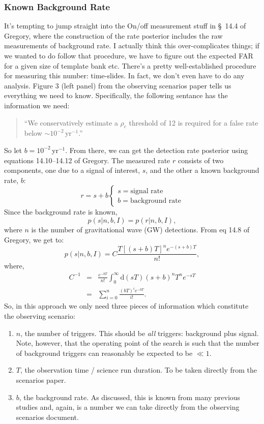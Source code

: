 \documentclass[twocolumn,nofootinbib]{revtex4-1}
\newcommand{\diff}{{\mathrm d}}
\def\gw#1{gravitational wave#1 (GW#1)\gdef\gw{GW}}
\begin{document}
\subsubsection{Known Background Rate}
It's tempting to jump straight into the On/off measurement stuff in \S~14.4 of
Gregory, where the construction of the rate posterior includes the raw
measurements of background rate.  I actually think this over-complicates things;
if we wanted to do follow that procedure, we have to figure out the expected FAR
for a given size of template bank etc.  There's a pretty well-established
procedure for measuring this number: time-slides.  In fact, we don't even have
to do any analysis.  Figure 3 (left panel) from the observing scenarios paper
tells us everything we need to know.  Specifically, the following sentance has
the information we need:
\begin{quote}
``We conservatively estimate a $\rho_c$ threshold of 12 is required for a false rate below
$\sim 10^{−2}$\,yr$^{−1}$.''
\end{quote}
%
So let $b=10^{-2}$\,yr$^{-1}$.  From there, we can get the detection rate
posterior using equations 14.10--14.12 of Gregory.  The measured rate $r$
consists of two components, one due to a signal of interest, $s$, and the other
a known background rate, $b$:
\begin{equation}
r = s + b
\begin{cases}
s = \text{signal rate} \\
b = \text{background rate}
\end{cases}
\end{equation}
%
Since the background rate is known,
\begin{equation}
p(s|n,b,I) = p(r|n,b,I),
\end{equation}
%
where $n$ is the number of \gw{} detections.  From eq 14.8 of Gregory, we get
to:
\begin{equation}
p(s|n,b,I) = C \frac{ T\left[(s+b)T\right]^n e^{-(s+b)T}}{n!},
\end{equation}
%
where,
\begin{eqnarray}
C^{-1} & = &\frac{e^{-bT}}{n!} \int_0^{\infty}\diff(sT)(s+b)^n T^n e^{-sT}\\
& = & \sum_{i=0}^n \frac{ (bT)^i e^{-bT}}{i!}.
\end{eqnarray}
%
So, in this approach we only need three pieces of information which constitute
the observing scenario:
\begin{enumerate}
\item $n$, the number of triggers.  This should be \emph{all} triggers:
background plus signal.  Note, however, that the operating point of the search
is such that the number of background triggers can reasonably be expected to be
$\ll 1$.
\item $T$, the observation time / science run duration.  To be taken directly
from the scenarios paper.
\item $b$, the background rate.  As discussed, this is known from many previous
studies and, again, is a number we can take directly from the observing
scenarios document.
\end{enumerate}
\end{document}
